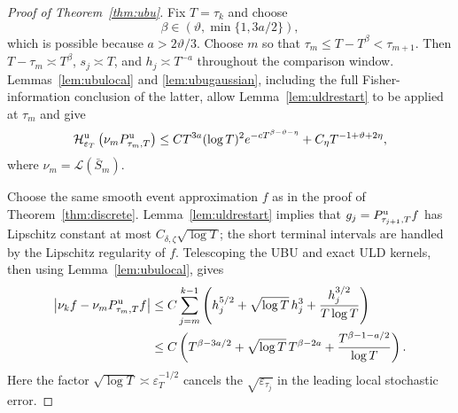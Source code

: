 \documentclass[11pt]{article}
\theoremstyle{definition}
\newcommand{\cH}{\mathcal H}
\newcommand{\eps}{\varepsilon}
\begin{document}
\begin{proof}[Proof of Theorem~\ref{thm:ubu}]
Fix $T=\tau_k$ and choose
\[
 \beta\in(\vartheta,\min\{1,3a/2\}),
\]
which is possible because $a>2\vartheta/3$. Choose $m$ so that
$\tau_m\leq T-T^\beta<\tau_{m+1}$. Then
$T-\tau_m\asymp T^\beta$, $s_j\asymp T$, and $h_j\asymp T^{-a}$ throughout
the comparison window. Lemmas~\ref{lem:ubulocal} and
\ref{lem:ubugaussian}, including the full Fisher-information conclusion of
the latter, allow Lemma~\ref{lem:uldrestart} to be applied at $\tau_m$ and give
\begin{equation}\label{eq:uburestartbound}
 \cH^{\rm u}_{\eps_T}\left(\nu_mP^{\rm u}_{\tau_m,T}\right)
 \leq CT^{3a}(\log T)^2e^{-cT^{\beta-\vartheta-\eta}}
       +C_\eta T^{-1+\vartheta+2\eta},
\end{equation}
where $\nu_m=\mathcal L(\bar S_m)$.

Choose the same smooth event approximation $f$ as in the proof of
Theorem~\ref{thm:discrete}. Lemma~\ref{lem:uldrestart} implies that
$g_j=P^{\rm u}_{\tau_{j+1},T}f$ has Lipschitz constant at most
$C_{\delta,\zeta}\sqrt{\log T}$; the short terminal intervals are handled by
the Lipschitz regularity of $f$. Telescoping the UBU and exact ULD kernels,
then using Lemma~\ref{lem:ubulocal}, gives
\begin{align}\label{eq:ubutelescoping}
 \left|\nu_kf-\nu_mP^{\rm u}_{\tau_m,T}f\right|
 &\leq C\sum_{j=m}^{k-1}\left(
       h_j^{5/2}+\sqrt{\log T}\,h_j^3
       +\frac{h_j^{3/2}}{T\log T}\right)\notag\\
 &\leq C\left(
       T^{\beta-3a/2}
       +\sqrt{\log T}\,T^{\beta-2a}
       +\frac{T^{\beta-1-a/2}}{\log T}\right).
\end{align}
Here the factor $\sqrt{\log T}\asymp\eps_T^{-1/2}$ cancels the
$\sqrt{\eps_{\tau_j}}$ in the leading local stochastic error.


\end{proof}
\end{document}
